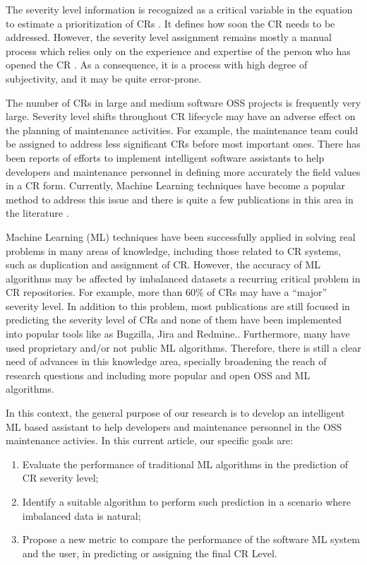 \documentclass[10pt, conference]{IEEEtran}
\begin{document}
The severity level information is recognized as a critical variable in the equation to estimate a prioritization of CRs \cite{Tian2012}. It defines how soon the CR needs to be addressed\cite{Lamkanfi2010}. However, the severity level assignment remains mostly a manual process which relies only on the experience and expertise of the person who has opened the CR \cite{Cavalcanti2014, Tian2012, Lamkanfi2010}. As a consequence, it is a process with high degree of subjectivity, and it may be quite error-prone. 

The number of CRs in large and medium software OSS projects \cite{Lamkanfi2011} is frequently very large. Severity level shifts throughout CR lifecycle may have an adverse effect on the planning of maintenance activities. For example, the maintenance team could be assigned to address less significant CRs before  most important ones. There has been reports of efforts to implement intelligent software assistants to help developers and maintenance personnel in defining more accurately the field values in a CR form. Currently, Machine Learning techniques have become a popular method to address this issue and there is quite a few publications in this area in the literature \cite{Cavalcanti2014}. 

Machine Learning (ML) techniques have been successfully applied in solving real problems in many areas of knowledge, including those related to CR systems, such as duplication and assignment of CR\cite{Cavalcanti2014}. However, the accuracy of ML algorithms may be affected by imbalanced datasets \cite{Chawla2009} \textemdash  a recurring critical problem in CR repositories\cite{Tian2015}. For example, more than 60\% of CRs may have a ``major'' severity level. In addition to this problem, most publications are still focused in predicting the severity level of CRs and none of them have been implemented into popular tools like as Bugzilla, Jira and Redmine.\cite{Cavalcanti2014}. Furthermore, many have used proprietary and/or not public ML algorithms. Therefore, there is still a clear need of advances in this knowledge area, specially broadening the reach of research questions and including more popular and open OSS and ML algorithms.


In this context, the general purpose of our research is to develop an intelligent ML based assistant to help developers and maintenance personnel in the OSS maintenance activies. In this current article, our specific goals are:

\begin{enumerate}[$G_1:$]
\item Evaluate the performance of traditional ML algorithms in the prediction of CR severity level; 
\item Identify a suitable algorithm to perform such prediction in a scenario where imbalanced data is natural;
\item Propose a new metric to compare the performance of the software ML system and the user, in predicting or assigning the final CR Level.
\end{enumerate}
\end{document}
